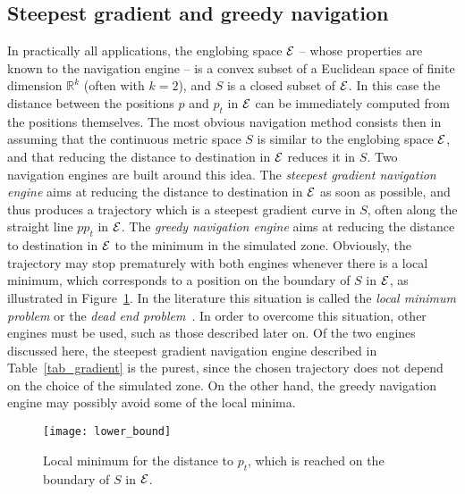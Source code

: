 \documentclass{article}
\newcommand{\englobing}{{\cal E}}
\begin{document}
\subsection{Steepest gradient and greedy navigation}
\label{sub_greedy}

In practically all applications, the englobing space $\englobing$ -- whose properties are known to the navigation engine -- is a convex subset of a Euclidean space of finite dimension $\mathbb{R}^k$ (often with $k=2$), and $S$ is a closed subset of $\englobing$. In this case the distance between the positions $p$ and $p_t$ in $\englobing$ can be immediately computed from the positions themselves.
The most obvious navigation method consists then in assuming that the continuous metric space $S$ is similar to the englobing space $\englobing$, and that reducing the distance to destination in $\englobing$ reduces it in $S$. 
Two navigation engines are built around this idea. The {\em steepest gradient navigation engine} aims at reducing the distance to destination in $\englobing$ as soon as possible, and thus produces a trajectory which is a steepest gradient curve in $S$, often along the straight line $pp_t$ in $\englobing$. The {\em greedy navigation engine} aims at reducing the distance to destination in $\englobing$ to the minimum in the simulated zone.
 Obviously, the trajectory may stop prematurely with both engines whenever there is a local minimum, which corresponds to a position on the boundary of $S$ in $\englobing$, as illustrated in Figure~\ref{fig_lower_bound}. In the literature this situation is called the {\em local minimum problem} or the {\em dead end problem}~\cite{bib_book}.
 In order to overcome this situation, other engines must be used, such as those described later on. Of the two engines discussed here, the steepest gradient navigation engine described in Table~\ref{tab_gradient} is the purest, since the chosen trajectory does not depend on the choice of the simulated zone. On the other hand, the greedy navigation engine may possibly avoid some of the local minima.

\begin{figure}[h]
\begin{center}
\texttt{[image: lower\_bound]}
\caption{Local minimum for the distance to $p_t$, which is reached on the boundary of $S$ in $\englobing$.}
\label{fig_lower_bound}
\end{center}
\end{figure}
\end{document}
